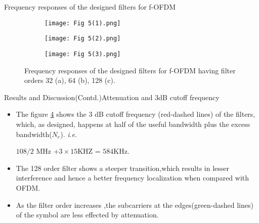 \documentclass{beamer}
\newcommand{\ie}{\textit{i}.\textit{e}.}
\begin{document}
\begin{frame}{Frequency responses of the designed filters for f-OFDM}
    \begin{figure}
        \centering
        \begin{subfigure}[b]{0.3\textwidth}
         \centering
         \texttt{[image: Fig 5(1).png]}
         \caption{}
         \label{fig:5(1)}
        \end{subfigure}
        \hfill
        \begin{subfigure}[b]{0.3\textwidth}
         \centering
         \texttt{[image: Fig 5(2).png]}
         \caption{}
         \label{fig:5(2)}
        \end{subfigure}
        \hfill
        \begin{subfigure}[b]{0.3\textwidth}
         \centering
         \texttt{[image: Fig 5(3).png]}
         \caption{}
         \label{fig:5(3)}
        \end{subfigure}
        \caption{Frequency responses of the designed filters for f-OFDM having filter orders 32 (a), 64 (b), 128 (c).}
        \label{fig:5}
    \end{figure}
\end{frame}
\begin{frame}{Results and Discussion(Contd.)}{Attenuation and 3dB cutoff frequency}
\begin{itemize}
    \item The figure \ref{fig:5} shows the 3 dB cutoff frequency (red-dashed lines) of the filters, which, as designed, happens at half of the useful bandwidth plus
the excess bandwidth($N_e$).    
 \ie
 
    $108/2$ MHz +$3 \times 15$KHZ = $584$KHz.

  \item The 128 order filter shows a steeper transition,which results in lesser interference and hence a better frequency localization when compared with OFDM.
  \item As the filter order increases ,the subcarriers at the edges(green-dashed lines) of the symbol are less effected by attenuation.
\end{itemize}
\end{frame}
\end{document}
